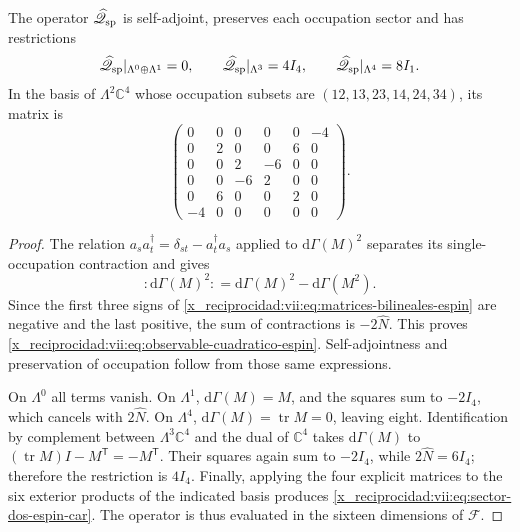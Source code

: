 \begin{proposition}
\label{x_reciprocidad:vii:prop:operador-espin-car}
The operator \(\widehat{\mathscr Q}_{\rm sp}\) is self-adjoint,
preserves each occupation sector and has restrictions
\begin{equation}
 \widehat{\mathscr Q}_{\rm sp}|_{\Lambda^0\oplus\Lambda^1}=0,
 \qquad
 \widehat{\mathscr Q}_{\rm sp}|_{\Lambda^3}=4I_4,
 \qquad
 \widehat{\mathscr Q}_{\rm sp}|_{\Lambda^4}=8I_1.
 \label{x_reciprocidad:vii:eq:sectores-espin-car}
\end{equation}
In the basis of \(\Lambda^2\mathbb C^4\) whose occupation
subsets are \((12,13,23,14,24,34)\), its matrix is
\begin{equation}
 \begin{pmatrix}
 0&0&0&0&0&-4\\
 0&2&0&0&6&0\\
 0&0&2&-6&0&0\\
 0&0&-6&2&0&0\\
 0&6&0&0&2&0\\
 -4&0&0&0&0&0
 \end{pmatrix}.
 \label{x_reciprocidad:vii:eq:sector-dos-espin-car}
\end{equation}
\end{proposition}
\begin{proof}
The relation \(a_s a_t^\dagger=\delta_{st}-a_t^\dagger a_s\)
applied to \(\mathrm d\Gamma(M)^2\) separates its
single-occupation contraction and gives
\[
 :\!\mathrm d\Gamma(M)^2\!:
 =\mathrm d\Gamma(M)^2-\mathrm d\Gamma(M^2).
\]
Since the first three signs of
\eqref{x_reciprocidad:vii:eq:matrices-bilineales-espin} are negative and the last
positive, the sum of contractions is \(-2\widehat N\).
This proves \eqref{x_reciprocidad:vii:eq:observable-cuadratico-espin}.
Self-adjointness and preservation of occupation follow from
those same expressions.

On \(\Lambda^0\) all terms vanish. On \(\Lambda^1\),
\(\mathrm d\Gamma(M)=M\), and the squares sum to \(-2I_4\),
which cancels with \(2\widehat N\). On \(\Lambda^4\),
\(\mathrm d\Gamma(M)=\operatorname{tr}M=0\), leaving eight.
Identification by complement between \(\Lambda^3\mathbb C^4\)
and the dual of \(\mathbb C^4\) takes
\(\mathrm d\Gamma(M)\) to
\((\operatorname{tr}M)I-M^{\mathsf T}=-M^{\mathsf T}\).
Their squares again sum to \(-2I_4\), while
\(2\widehat N=6I_4\); therefore the restriction is \(4I_4\).
Finally, applying the four explicit matrices to the
six exterior products of the indicated basis produces
\eqref{x_reciprocidad:vii:eq:sector-dos-espin-car}. The operator is thus evaluated
in the sixteen dimensions of \(\mathcal F\).
\end{proof}

